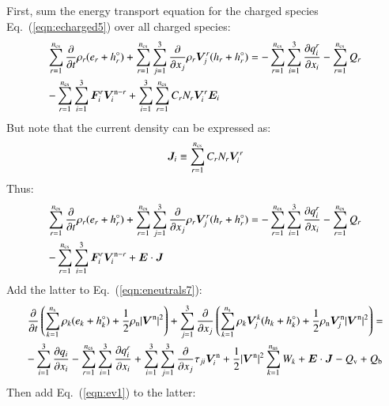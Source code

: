 \documentclass{warpdoc}
\newcommand{\alb}{\vspace{0.1cm}\\} %
\newcommand{\mfd}{\displaystyle}
\newcommand{\ns}{{n_{\rm s}}}
\newcommand{\nns}{{n_{\rm ns}}}
\newcommand{\ncs}{{n_{\rm cs}}}
\renewcommand{\vec}[1]{\bm{#1}}
\begin{document}
First, sum the energy transport equation for the charged species Eq.\ (\ref{eqn:echarged5}) over all charged species:
%
\begin{equation}
\begin{array}{l}\mfd
\sum_{r=1}^\ncs \frac{\partial }{\partial t}\rho_r (e_r+h_r^\circ) 
+ \sum_{r=1}^\ncs \sum_{j=1}^3  \frac{\partial }{\partial x_j} \rho_r \vec{V}^r_j (h_r+h_r^\circ) 
= 
- \sum_{r=1}^\ncs \sum_{i=1}^{3}\frac{\partial q_i^r}{\partial x_i}
- \sum_{r=1}^\ncs Q_{r} \alb\mfd
-\sum_{r=1}^\ncs \sum_{i=1}^3 \vec{F}_i^r \vec{V}_i^{{\rm n}-r} 
+ \sum_{i=1}^3 \sum_{r=1}^\ncs  C_r N_r  \vec{V}^r_i \vec{E}_i
\end{array}
\end{equation}
%  
But note that the current density can be expressed as:
%
\begin{equation}
 \vec{J}_i \equiv \sum_{r=1}^\ncs  C_r N_r  \vec{V}^r_i
\end{equation}
%
Thus:
%
\begin{equation}
\begin{array}{l}\mfd
\sum_{r=1}^\ncs \frac{\partial }{\partial t}\rho_r (e_r+h_r^\circ) 
+ \sum_{r=1}^\ncs \sum_{j=1}^3  \frac{\partial }{\partial x_j} \rho_r \vec{V}^r_j (h_r+h_r^\circ) 
= 
- \sum_{r=1}^\ncs \sum_{i=1}^{3}\frac{\partial q_i^r}{\partial x_i}
- \sum_{r=1}^\ncs Q_{r}\alb\mfd
-\sum_{r=1}^\ncs \sum_{i=1}^3 \vec{F}_i^r \vec{V}_i^{{\rm n}-r} 
+ \vec{E}\cdot\vec{J}
\end{array}
\end{equation}
%  
Add the latter to Eq.\ (\ref{eqn:eneutrals7}):
%
\begin{equation}
\begin{array}{l}\mfd
 \frac{\partial }{\partial t}\left(\sum_{k=1}^\ns \rho_k (e_k+h_k^\circ)+\frac{1}{2}\rho_{\rm n}|\vec{V}^{\rm n}|^2 \right) 
+ \sum_{j=1}^3  \frac{\partial }{\partial x_j} \left(\sum_{k=1}^\ns \rho_k \vec{V}^k_j (h_k+h_k^\circ)+\frac{1}{2}\rho_{\rm n}\vec{V}^{\rm n}_j|\vec{V}^{\rm n}|^2 \right)
= \alb\mfd
-\sum_{i=1}^{3}\frac{\partial q_i}{\partial x_i}
- \sum_{r=1}^\ncs \sum_{i=1}^{3}\frac{\partial q_i^r}{\partial x_i}
+\sum_{i=1}^3 \sum_{j=1}^3  \frac{\partial }{\partial x_j} \tau_{ji} \vec{V}_i^{\rm n}
+\frac{1}{2}|\vec{V}^{\rm n}|^2 \sum_{k=1}^\nns W_k
+ \vec{E}\cdot\vec{J}
-  Q_{\rm v}
+ Q_{\rm b}
\end{array}
\end{equation}
%  
Then add Eq.\ (\ref{eqn:ev1}) to the latter:
%
\end{document}
